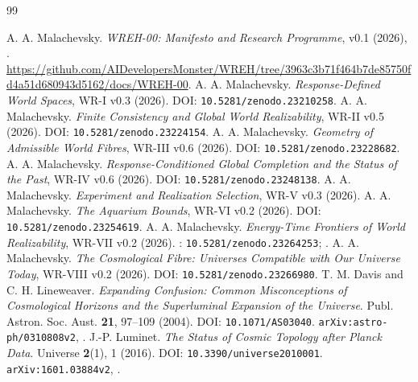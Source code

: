 \begin{thebibliography}{99}
\raggedright
{} A. A. Malachevsky. \emph{WREH-00: Manifesto and Research Programme}, v0.1 (2026), . \url{https://github.com/AIDevelopersMonster/WREH/tree/3963c3b71f464b7de85750fd4a51d680943d5162/docs/WREH-00}.
 A. A. Malachevsky. \emph{Response-Defined World Spaces}, WR-I v0.3 (2026). DOI: \texttt{10.5281/zenodo.23210258}.
 A. A. Malachevsky. \emph{Finite Consistency and Global World Realizability}, WR-II v0.5 (2026). DOI: \texttt{10.5281/zenodo.23224154}.
 A. A. Malachevsky. \emph{Geometry of Admissible World Fibres}, WR-III v0.6 (2026). DOI: \texttt{10.5281/zenodo.23228682}.
 A. A. Malachevsky. \emph{Response-Conditioned Global Completion and the Status of the Past}, WR-IV v0.6 (2026). DOI: \texttt{10.5281/zenodo.23248138}.
 A. A. Malachevsky. \emph{Experiment and Realization Selection}, WR-V v0.3 (2026). 
 A. A. Malachevsky. \emph{The Aquarium Bounds}, WR-VI v0.2 (2026). DOI: \texttt{10.5281/zenodo.23254619}.
 A. A. Malachevsky. \emph{Energy-Time Frontiers of World Realizability}, WR-VII v0.2 (2026). : \texttt{10.5281/zenodo.23264253}; .
 A. A. Malachevsky. \emph{The Cosmological Fibre: Universes Compatible with Our Universe Today}, WR-VIII v0.2 (2026). DOI: \nolinkurl{10.5281/zenodo.23266980}.
 T. M. Davis and C. H. Lineweaver. \emph{Expanding Confusion: Common Misconceptions of Cosmological Horizons and the Superluminal Expansion of the Universe}. Publ. Astron. Soc. Aust. \textbf{21}, 97--109 (2004). DOI: \texttt{10.1071/AS03040}. \texttt{arXiv:astro-ph/0310808v2}, .
 J.-P. Luminet. \emph{The Status of Cosmic Topology after Planck Data}. Universe \textbf{2}(1), 1 (2016). DOI: \texttt{10.3390/universe2010001}. \texttt{arXiv:1601.03884v2}, .
\end{thebibliography}
